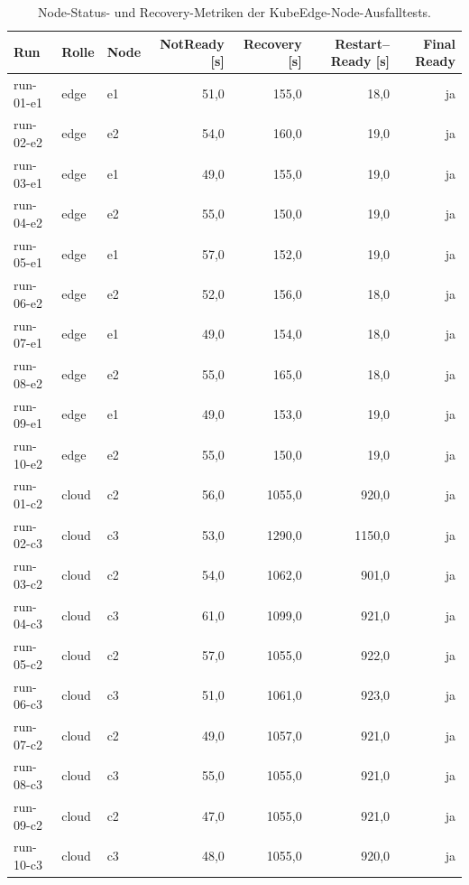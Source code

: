 \begin{table}[H]
\centering
\begin{tabular}{lllrrrr}
\toprule
\textbf{Run} & \textbf{Rolle} & \textbf{Node} & \textbf{NotReady [s]} & \textbf{Recovery [s]} & \textbf{Restart--Ready [s]} & \textbf{Final Ready} \\
\midrule
run-01-e1 & edge & e1 & 51,0 & 155,0 & 18,0 & ja \\
run-02-e2 & edge & e2 & 54,0 & 160,0 & 19,0 & ja \\
run-03-e1 & edge & e1 & 49,0 & 155,0 & 19,0 & ja \\
run-04-e2 & edge & e2 & 55,0 & 150,0 & 19,0 & ja \\
run-05-e1 & edge & e1 & 57,0 & 152,0 & 19,0 & ja \\
run-06-e2 & edge & e2 & 52,0 & 156,0 & 18,0 & ja \\
run-07-e1 & edge & e1 & 49,0 & 154,0 & 18,0 & ja \\
run-08-e2 & edge & e2 & 55,0 & 165,0 & 18,0 & ja \\
run-09-e1 & edge & e1 & 49,0 & 153,0 & 19,0 & ja \\
run-10-e2 & edge & e2 & 55,0 & 150,0 & 19,0 & ja \\
run-01-c2 & cloud & c2 & 56,0 & 1055,0 & 920,0 & ja \\
run-02-c3 & cloud & c3 & 53,0 & 1290,0 & 1150,0 & ja \\
run-03-c2 & cloud & c2 & 54,0 & 1062,0 & 901,0 & ja \\
run-04-c3 & cloud & c3 & 61,0 & 1099,0 & 921,0 & ja \\
run-05-c2 & cloud & c2 & 57,0 & 1055,0 & 922,0 & ja \\
run-06-c3 & cloud & c3 & 51,0 & 1061,0 & 923,0 & ja \\
run-07-c2 & cloud & c2 & 49,0 & 1057,0 & 921,0 & ja \\
run-08-c3 & cloud & c3 & 55,0 & 1055,0 & 921,0 & ja \\
run-09-c2 & cloud & c2 & 47,0 & 1055,0 & 921,0 & ja \\
run-10-c3 & cloud & c3 & 48,0 & 1055,0 & 920,0 & ja \\
\bottomrule
\end{tabular}
\caption{Node-Status- und Recovery-Metriken der KubeEdge-Node-Ausfalltests.}
\label{tab:appendix-kubeedge-node-failure-nodes}
\end{table}
